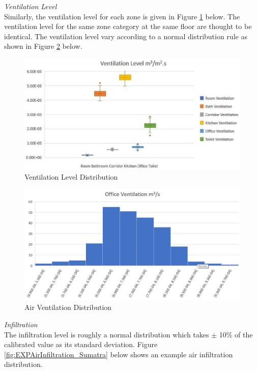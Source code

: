 \documentclass[11pt, a4paper]{article}
\theoremstyle{definition}
\begin{document}
		\textit{Ventilation Level}\\
			Similarly, the ventilation level for each zone is given in Figure \ref{fig:VentLevel} below. The ventilation level for the same zone category at the same floor are thought to be identical. The ventilation level vary according to a normal distribution rule as shown in Figure \ref{fig:VentDist} below.\\
			\begin{figure}[H]
			\centering
			\includegraphics[scale=0.55]{VentilationLevel.jpg}
			\caption{Ventilation Level Distribution}
			\label{fig:VentLevel}
			\end{figure}

			\begin{figure}[H]
			\centering
			\includegraphics[scale=0.55]{Office_Vent.jpg}
			\caption{Air Ventilation Distribution}
			\label{fig:VentDist}
			\end{figure}
			
			
		\textit{Infiltration}\\
			The infiltration level is roughly a normal distribution which takes $\pm$ 10\% of the calibrated value as its standard deviation. Figure \ref{fig:EXPAirInfiltration_Sumatra} below shows an example air infiltration distribution.\\
\end{document}

